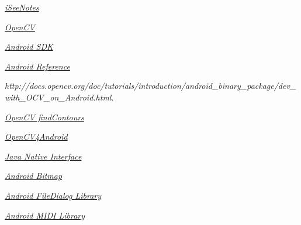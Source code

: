 \documentclass[pdftex,11pt,a4paper]{article}
\begin{document}


\renewcommand{\abstractname}{Executive Summary}

\tableofcontents
\listoffigures
\listoftables







\begin{thebibliography}{9}

    \emph{\href{http://www.iseenotes.com}{iSeeNotes}}

    \emph{\href{http://opencv.org/}{OpenCV}}

    \emph{\href{http://developer.android.com/sdk/index.html}{Android SDK}}

    \emph{\href{http://developer.android.com/reference/android/app/Activity.html}{Android Reference}}

  \emph{http://docs.opencv.org/doc/tutorials/introduction/android\_binary\_package/dev\_with\_OCV\_on\_Android.html}.

    \emph{\href{http://docs.opencv.org/modules/imgproc/doc/structural_analysis_and_shape_descriptors.html}{OpenCV findContours}}

    \emph{\href{http://opencv.org/android}{OpenCV4Android}}

    \emph{\href{http://docs.oracle.com/javase/6/docs/technotes/guides/jni/spec/jniTOC.html}{Java Native Interface}}

    \emph{\href{http://developer.android.com/reference/android/graphics/Bitmap.html}{Android Bitmap}}

    \emph{\href{https://code.google.com/p/android-file-dialog/}{Android FileDialog Library}}

    \emph{\href{https://code.google.com/p/android-midi-lib/}{Android MIDI Library}}

\end{thebibliography}
\end{document}
